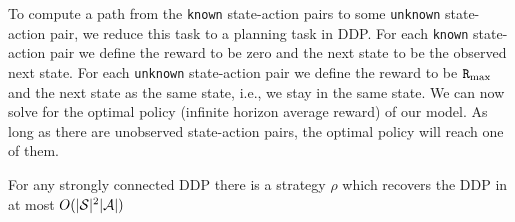To compute a path from the \texttt{known} state-action pairs to some \texttt{unknown}
state-action pair, we reduce this task to a planning task in DDP.
%
For each \texttt{known} state-action pair  we define the reward to be zero and the
next state to be the observed next state. For each \texttt{unknown}
state-action pair we define the reward to be ${\tt R}_{\max }$ and the next state
as the same state, i.e., we stay in the same state. We can now solve for the optimal
policy (infinite horizon average reward) of our model. As long as
there are unobserved state-action pairs, the optimal policy will
reach one of them.

\begin{theorem}
For any strongly connected DDP there is a strategy $\rho$ which
recovers the DDP in at most $O(|\mathcal{S}|^2 |\mathcal{A}|)$
\end{theorem}

